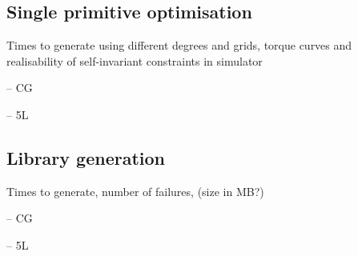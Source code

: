 \subsection{Single primitive optimisation}
Times to generate using different degrees and grids, torque curves and realisability of self-invariant constraints in simulator

-- CG

-- 5L

\subsection{Library generation}
Times to generate, number of failures, (size in MB?)

-- CG

-- 5L